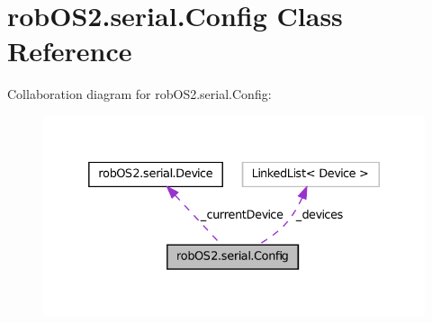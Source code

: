 \hypertarget{classrob_o_s2_1_1serial_1_1_config}{
\section{robOS2.serial.Config Class Reference}
\label{classrob_o_s2_1_1serial_1_1_config}
}


Collaboration diagram for robOS2.serial.Config:\nopagebreak
\begin{figure}[H]
\begin{center}
\leavevmode
\includegraphics[width=332pt]{classrob_o_s2_1_1serial_1_1_config__coll__graph}
\end{center}
\end{figure}
